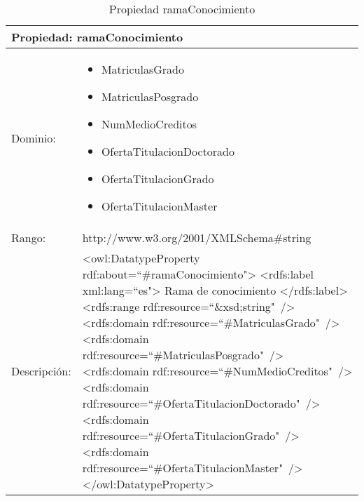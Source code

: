 \begin{table}[!ht]
	\centering
	\begin{tabular}{|p{}|p{}|}
		\hline
		\multicolumn{2}{|l|}{Propiedad: \textbf{ramaConocimiento}}
		\\ \hline
		Dominio:&
		\begin{itemize}
			\item MatriculasGrado
			\item MatriculasPosgrado
			\item NumMedioCreditos
			\item OfertaTitulacionDoctorado
			\item OfertaTitulacionGrado
			\item OfertaTitulacionMaster
		\end{itemize}
		\\ \hline
		Rango:&
		http://www.w3.org/2001/XMLSchema\#string
		\\ \hline
		Descripción:&
		\textless owl:DatatypeProperty rdf:about=``\#ramaConocimiento"\textgreater\newline 
		\tab\textless rdfs:label xml:lang=``es"\textgreater\newline
		\tab\tab Rama de conocimiento\newline
		\tab\textless /rdfs:label\textgreater\newline
		\tab\textless rdfs:range\newline
		\tab\tab rdf:resource=``\&xsd;string"\ /\textgreater\newline
		\tab\textless rdfs:domain\newline
		\tab\tab rdf:resource=``\#MatriculasGrado"\ /\textgreater\newline
		\tab\textless rdfs:domain\newline
		\tab\tab rdf:resource=``\#MatriculasPosgrado"\ /\textgreater\newline
		\tab\textless rdfs:domain\newline
		\tab\tab rdf:resource=``\#NumMedioCreditos"\ /\textgreater\newline
		\tab\textless rdfs:domain\newline
		\tab\tab rdf:resource=``\#OfertaTitulacionDoctorado"\ /\textgreater\newline
		\tab\textless rdfs:domain\newline
		\tab\tab rdf:resource=``\#OfertaTitulacionGrado"\ /\textgreater\newline
		\tab\textless rdfs:domain\newline
		\tab\tab rdf:resource=``\#OfertaTitulacionMaster"\ /\textgreater\newline
		\textless /owl:DatatypeProperty\textgreater
		\\ \hline
	\end{tabular}
	\caption{Propiedad ramaConocimiento}
	\label{propiedad-ramaconocimiento}
\end{table}


